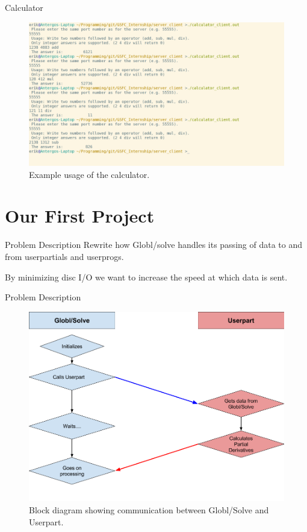 \documentclass{beamer}
\begin{document}
   \begin{frame}{Calculator}
        \begin{figure}[ht]
            \centering
            \includegraphics[width=1\columnwidth]{calculator}
            \caption{Example usage of the calculator.}
        \end{figure}
    \end{frame}


    \section{Our First Project}

    \begin{frame}{Problem Description}
        Rewrite how Globl/solve handles its passing of data to and from
        userpartials and userprogs.

        By minimizing disc I/O we want to increase the speed at which data is
        sent.
    \end{frame}
    \begin{frame}{Problem Description}
        \begin{figure}[ht]
            \centering
            \includegraphics[width=1\columnwidth]{globlsolveblock}
            \caption{Block diagram showing communication between Globl/Solve
                     and Userpart.}
        \end{figure}
    \end{frame}
\end{document}
